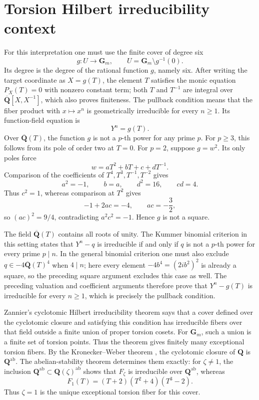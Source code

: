 \section{Torsion Hilbert irreducibility context}

For this interpretation one must use the finite cover of degree six
\[
 g:U\longrightarrow\mathbf G_m,
 \qquad
 U=\mathbf G_m\setminus g^{-1}(0).
\]
Its degree is the degree of the rational function $g$, namely six.
After writing the target coordinate as $X=g(T)$, the element $T$
satisfies the monic equation $P_X(T)=0$ with nonzero constant term;
both $T$ and $T^{-1}$ are integral over
$\overline{\mathbf Q}[X,X^{-1}]$, which also proves finiteness.  The
pullback condition means that
the fiber product with $x\mapsto x^n$ is geometrically irreducible for
every $n\ge1$.  Its function-field equation is
\[
 Y^n=g(T).
\]
Over $\overline{\mathbf Q}(T)$, the function $g$ is not a $p$-th power
for any prime $p$.  For $p\ge3$, this follows from its pole of order two
at $T=0$.  For $p=2$, suppose $g=w^2$.  Its only poles force
\[
 w=aT^2+bT+c+dT^{-1}.
\]
Comparison of the coefficients of $T^4,T^3,T^{-1},T^{-2}$ gives
\[
 a^2=-1,\qquad b=a,\qquad d^2=16,\qquad cd=4.
\]
Thus $c^2=1$, whereas comparison at $T^2$ gives
\[
 -1+2ac=-4,
 \qquad ac=-\frac32,
\]
so $(ac)^2=9/4$, contradicting $a^2c^2=-1$.  Hence $g$ is not a
square.

The field $\overline{\mathbf Q}(T)$ contains all roots of unity.  The
Kummer binomial criterion \cite{Lang2002} in this setting states that
$Y^n-q$ is irreducible if and only if $q$ is not a $p$-th power for
every prime $p\mid n$.  In the general binomial criterion one must also
exclude $q\in-4\overline{\mathbf Q}(T)^4$ when $4\mid n$; here every
element $-4b^4=(2ib^2)^2$ is already a square, so the preceding square
argument excludes this case as well.  The preceding valuation
and coefficient arguments therefore prove that $Y^n-g(T)$ is
irreducible for every $n\ge1$, which is precisely the pullback
condition.

Zannier's cyclotomic Hilbert irreducibility theorem
\cite[Theorem 2.1]{Zannier2010} says that a cover defined over the cyclotomic
closure and satisfying this condition has irreducible fibers over that
field outside a finite union of proper torsion cosets.  For
$\mathbf G_m$, such a union is a finite set of torsion points.  Thus the
theorem gives finitely many exceptional torsion fibers.  By the
Kronecker--Weber theorem \cite{Washington1997}, the cyclotomic closure of
$\mathbf Q$ is $\mathbf Q^{\mathrm{ab}}$.  The abelian-stability
theorem determines them exactly: for $\zeta\ne1$, the inclusion
$\mathbf Q^{\mathrm{ab}}\subset\mathbf Q(\zeta)^{\mathrm{ab}}$ shows
that $F_\zeta$ is irreducible over $\mathbf Q^{\mathrm{ab}}$, whereas
\[
 F_1(T)=(T+2)(T^2+4)(T^3-2).
\]
Thus $\zeta=1$ is the unique exceptional torsion fiber for this cover.
